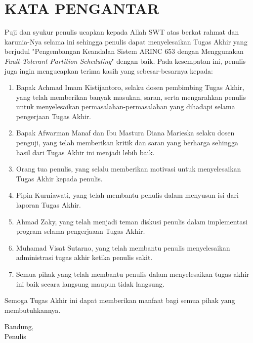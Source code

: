 \chapter*{KATA PENGANTAR}

Puji dan syukur penulis ucapkan kepada Allah SWT atas berkat rahmat dan karunia-Nya selama ini
sehingga penulis dapat menyelesaikan Tugas Akhir yang berjudul "Pengembangan Keandalan Sistem
ARINC 653 dengan Menggunakan \textit{Fault-Tolerant Partition Scheduling}" dengan baik.  Pada
kesempatan ini, penulis juga ingin mengucapkan terima kasih yang sebesar-besarnya kepada:

\begin{enumerate}
	\item Bapak Achmad Imam Kistijantoro, selaku dosen pembimbing Tugas Akhir, yang telah
		memberikan banyak masukan, saran, serta mengarahkan penulis untuk menyelesaikan
		permasalahan-permasalahan yang dihadapi selama pengerjaan Tugas Akhir.
	\item Bapak Afwarman Manaf dan Ibu Mastura Diana Marieska selaku dosen
		penguji, yang telah memberikan  kritik dan saran yang berharga sehingga hasil
		dari Tugas Akhir ini menjadi lebih baik.
	\item Orang tua penulis, yang selalu memberikan motivasi untuk menyelesaikan Tugas Akhir
		kepada penulis.
	\item Pipin Kurniawati, yang telah membantu penulis dalam menyusun isi dari laporan
		Tugas Akhir.
	\item Ahmad Zaky, yang telah menjadi teman diskusi penulis dalam implementasi program
		selama pengerjaaan Tugas Akhir.
	\item Muhamad Visat Sutarno, yang telah membantu penulis menyelesaikan administrasi
		tugas akhir ketika penulis sakit.
	\item Semua  pihak  yang  telah  membantu  penulis  dalam  menyelesaikan  tugas akhir
		ini baik secara langsung maupun tidak langsung.
\end{enumerate}

Semoga Tugas Akhir ini dapat memberikan manfaat bagi semua pihak yang membutuhkannya.

\begin{flushright}
	Bandung, \bulan\ \tahun\\[15mm]
	Penulis
\end{flushright}

